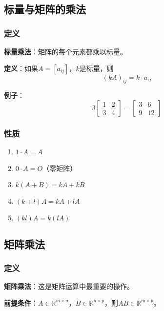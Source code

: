 \documentclass[12pt,a4paper]{article}
\begin{document}
\subsection{标量与矩阵的乘法}

\subsubsection{定义}

\textbf{标量乘法}：矩阵的每个元素都乘以标量。

\textbf{定义}：如果$A = [a_{ij}]$，$k$是标量，则
\begin{equation}
(kA)_{ij} = k \cdot a_{ij}
\end{equation}

\textbf{例子}：
\begin{equation}
3 \begin{bmatrix} 1 & 2 \\ 3 & 4 \end{bmatrix} = \begin{bmatrix} 3 & 6 \\ 9 & 12 \end{bmatrix}
\end{equation}

\subsubsection{性质}

\begin{enumerate}
\item $1 \cdot A = A$
\item $0 \cdot A = O$（零矩阵）
\item $k(A + B) = kA + kB$
\item $(k + l)A = kA + lA$
\item $(kl)A = k(lA)$
\end{enumerate}

\subsection{矩阵乘法}

\subsubsection{定义}

\textbf{矩阵乘法}：这是矩阵运算中最重要的操作。

\textbf{前提条件}：$A \in \mathbb{R}^{m \times n}$，$B \in \mathbb{R}^{n \times p}$，则$AB \in \mathbb{R}^{m \times p}$。
\end{document}
